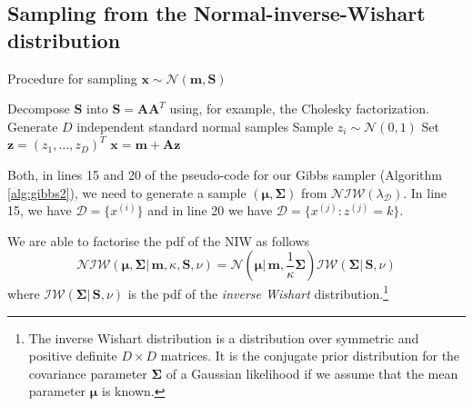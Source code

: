 \documentclass[final,3p,times,twocolumn]{elsarticle}
\let\bs\boldsymbol
\begin{document}
\subsection{Sampling from the Normal-inverse-Wishart distribution}

\begin{algorithm}
\caption{Procedure for sampling $\bs x \sim \mathcal{N}(\bs m,\bs S)$}
\label{alg:gauss}
\begin{algorithmic}[1]
\State Decompose $\bs S$ into $\bs S = \bs A \bs A^T$ using, for example, the Cholesky factorization.
\Statex\State\Comment Generate $D$ independent standard normal samples
\State Sample $z_i \sim \mathcal{N}(0,1)$
\EndFor
\State Set $\bs z = (z_1,\dots,z_D)^T$
\Statex\State\Return $\bs x = \bs m + \bs A \bs z$
\end{algorithmic}
\end{algorithm}

Both, in lines 15 and 20 of the pseudo-code for our Gibbs sampler (Algorithm \ref{alg:gibbs2}), we need to generate a sample $(\bs\mu,\bs\Sigma)$ from $\mathcal{NIW}(\lambda_\mathcal{D})$.
In line 15, we have $\mathcal{D} = \{x^{(i)}\}$ and in line 20 we have $\mathcal{D} = \{x^{(j)} : z^{(j)} = k\}$.

We are able to factorise the pdf of the NIW as follows 
\begin{equation*}
\mathcal{NIW}(\bs\mu,\bs\Sigma|\,\bs m,\kappa,\bs S,\nu) = \mathcal{N}(\bs\mu|\,\bs m,\frac{1}{\kappa}\bs\Sigma)\mathcal{IW}(\bs\Sigma|\,\bs S,\nu)
\end{equation*}
where $\mathcal{IW}(\bs\Sigma|\,\bs S,\nu)$ is the pdf of the \emph{inverse Wishart} distribution.\footnote{The inverse Wishart distribution is a distribution over symmetric and positive definite $D\times D$ matrices. It is the conjugate prior distribution for the covariance parameter $\bs\Sigma$ of a Gaussian likelihood if we assume that the mean parameter $\bs\mu$ is known.}
\end{document}

